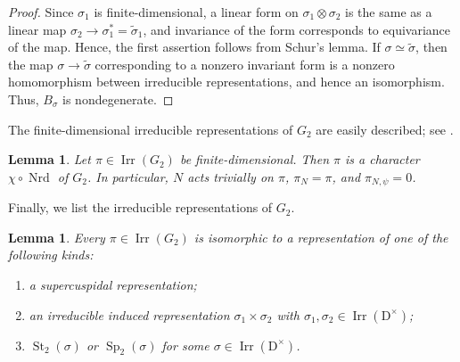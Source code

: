 \documentclass[11pt]{amsart}
\numberwithin{equation}{section}
\theoremstyle{plain}
\newtheorem{lemma}[theorem]{Lemma}
\theoremstyle{definition}
\theoremstyle{remark}
\DeclareMathOperator{\Irr}{Irr}
\DeclareMathOperator{\Nrd}{Nrd}
\DeclareMathOperator{\St}{St}
\DeclareMathOperator{\Sp}{Sp}
\begin{document}
\begin{proof}
	Since $\sigma_1$ is finite-dimensional, a linear form on $\sigma_1\otimes\sigma_2$ is the same as a linear map $\sigma_2\to\sigma_1^*=\widetilde\sigma_1$, and invariance of the form corresponds to equivariance of the map. Hence, the first assertion follows from Schur's lemma. If $\sigma\simeq\widetilde\sigma$, then the map $\sigma\to\widetilde\sigma$ corresponding to a nonzero invariant form is a nonzero homomorphism between irreducible representations, and hence an isomorphism. Thus, $B_\sigma$ is nondegenerate.
\end{proof}

The finite-dimensional irreducible representations of $G_2$ are easily described; see \cite[Proposition 3.2.1]{Rag99}.

\begin{lemma}\label{lem:G2-finite-dim}
	Let $\pi\in\Irr(G_2)$ be finite-dimensional. Then $\pi$ is a character $\chi\circ\Nrd$ of $G_2$. In particular, $N$ acts trivially on $\pi$, $\pi_N=\pi$, and $\pi_{N,\psi}=0$.
\end{lemma}

Finally, we list the irreducible representations of $G_2$.

\begin{lemma}\label{lem:G2-kinds}
	Every $\pi\in\Irr(G_2)$ is isomorphic to a representation of one of the following kinds:
	\begin{enumerate}
		\item a supercuspidal representation;
		\item an irreducible induced representation $\sigma_1\times\sigma_2$ with $\sigma_1,\sigma_2\in\Irr(\mathrm{D}^\times)$;
		\item $\St_2(\sigma)$ or $\Sp_2(\sigma)$ for some $\sigma\in\Irr(\mathrm{D}^\times)$.
	\end{enumerate}
\end{lemma}
\end{document}
